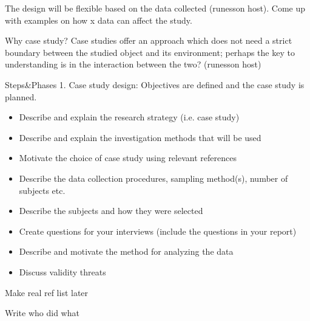 \documentclass[times, 10pt,twocolumn]{IEEEtran}
\begin{document}
The design will be flexible based on the data collected (runesson host). 
	Come up with examples on how x data can affect the study. 


Why case study? 
Case studies offer an approach which does not need a strict boundary between the studied object and its environment; perhaps the key to understanding is in the interaction between the two? (runesson host)

Steps\&Phases
1. Case study design: Objectives are defined and the case study is planned. 

\begin{itemize}
\item Describe and explain the research strategy (i.e. case study)
\item Describe and explain the investigation methods that will be used
\item Motivate the choice of case study using relevant references
\item Describe the data collection procedures, sampling method(s), number of subjects etc.
\item Describe the subjects and how they were selected
\item Create questions for your interviews (include the questions in your report)
\item Describe and motivate the method for analyzing the data
\item Discuss validity threats
\end{itemize}

Make real ref list later


Write who did what
\end{document}
